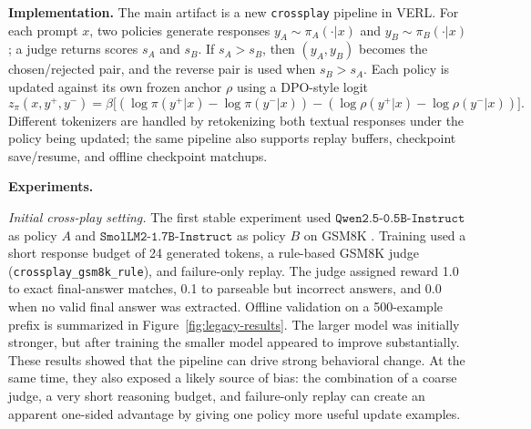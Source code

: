 \documentclass[10pt,a4paper]{article}
\begin{document}
\textbf{Implementation.}
The main artifact is a new \texttt{crossplay} pipeline in VERL. For each prompt $x$, two policies generate responses $y_A \sim \pi_A(\cdot|x)$ and $y_B \sim \pi_B(\cdot|x)$; a judge returns scores $s_A$ and $s_B$. If $s_A > s_B$, then $(y_A,y_B)$ becomes the chosen/rejected pair, and the reverse pair is used when $s_B > s_A$. Each policy is updated against its own frozen anchor $\rho$ using a DPO-style logit
\[
z_\pi(x,y^+,y^-)
=
\beta\big[(\log\pi(y^+|x)-\log\pi(y^-|x))-(\log\rho(y^+|x)-\log\rho(y^-|x))\big].
\]
Different tokenizers are handled by retokenizing both textual responses under the policy being updated; the same pipeline also supports replay buffers, checkpoint save/resume, and offline checkpoint matchups.

\textbf{Experiments.}

\textit{Initial cross-play setting.}
\newline
The first stable experiment used $\texttt{Qwen2.5-0.5B-Instruct}$ as policy $A$ and $\texttt{SmolLM2-1.7B-Instruct}$ as policy $B$ on GSM8K \cite{gsm8k}. Training used a short response budget of 24 generated tokens, a rule-based GSM8K judge (\texttt{crossplay\_gsm8k\_rule}), and failure-only replay. The judge assigned reward 1.0 to exact final-answer matches, 0.1 to parseable but incorrect answers, and 0.0 when no valid final answer was extracted. Offline validation on a 500-example prefix is summarized in Figure~\ref{fig:legacy-results}. The larger model was initially stronger, but after training the smaller model appeared to improve substantially. These results showed that the pipeline can drive strong behavioral change. At the same time, they also exposed a likely source of bias: the combination of a coarse judge, a very short reasoning budget, and failure-only replay can create an apparent one-sided advantage by giving one policy more useful update examples.
\end{document}
